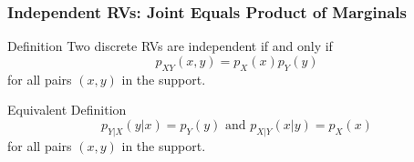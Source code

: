\documentclass[handout]{beamer}
\begin{document}
\begin{frame}
\frametitle{Independent RVs: Joint Equals Product of Marginals}


\begin{block}{Definition}
  Two discrete RVs are \alert{independent} if and only if
  $$p_{XY}(x,y) = p_X(x)p_Y(y)$$ for all pairs $(x,y)$ in the support.
\end{block}


\begin{block}{Equivalent Definition}
  \vspace{-1em}
  $$p_{Y|X}(y|x) = p_Y(y) \mbox{ and } p_{X|Y}(x|y) = p_X(x)$$
  for all pairs $(x,y)$ in the support.
\end{block}

\end{frame}
\end{document}
